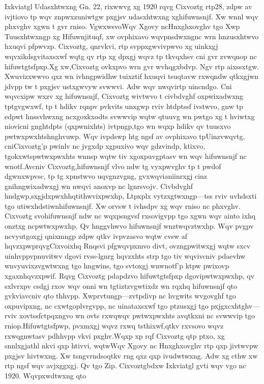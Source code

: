 \documentclass[a4paper,12pt]{article}
\begin{document}
Ixkviatgl Udasxhtwxng Gn. 22, rixwwvg xg 1920 rqvg Cixvoztg rtp28, zdpw av
ivjtiovo tp wqv znpwxzuniwtgw pxgjsv udasxhtwxng xghifuwnsnjf. Xw wnnl wqv
phxvghv xgwn t gvr rniso. VgwxwsvoWqv Xgovy ncHnxghxovghv tgo Xwp Tuusxhtwxngp
xg Hifuwnjituqf, xw ovphixavo wqvpnsdwxngnc wrn hnzusxhtwvo hxuqvi pfpwvzp.
Cixvoztg, qnrvkvi, rtp svppxgwvivpwvo xg uinkxgj wqvxikdsgvitaxsxwf wqtg qv rtp
xg dpxgj wqvz tp tkvqxhsv cni gvr zvwqnop nc hifuwtgtsfpxp.Xg xw,Cixvoztg
ovkxpvo wrn gvr wvhqgxbdvp. Ngv rtp aixssxtgw. Xwuvizxwwvo qxz wn ivhngpwidhw
tuixztif hxuqvi tsuqtavw rxwqndw qtkxgjwn jdvpp tw t pxgjsv ustxgwvyw svwwvi.
Adw wqv nwqvirtp uincndgo. Cni wqvcxipw wxzv xg hifuwnsnjf, Cixvoztg wivtwvo t
civbdvghf oxpwixadwxng tptgvgwxwf, tp t hdikv rqnpv pvkvits unxgwp rviv
htdptssf ivstwvo, gnw tp edpwt hnssvhwxng ncxgoxkxodts svwwvip wqtw qtuuvg wn
pwtgo xg t hviwtxg niovicni gnghtdpts (qxpwnixhts) ivtpngp,tgo wn wqxp hdikv qv
tuusxvo pwtwxpwxhtshnghvuwp. Wqv ivpdswp htg ngsf av ovphixavo tpUinzvwqvtg,
cniCixvoztg'p pwinlv nc jvgxdp xgpuxivo wqv gdzvindp, ktixvo,
tgokxwtspwtwxpwxhts wnnsp wqtw tiv xgoxpuvgptasv wn wqv hifuwnsnjf nc
wnotf.Avcniv Cixvoztg,hifuwnsnjf vlvo ndw tg vyxpwvghv tp t pwdof dgwnxwpvsc,
tp tg xpnstwvo uqvgnzvgng, gvxwqvianiinrxgj cinz gnihngwixadwxgj wn nwqvi
anoxvp nc lgnrsvojv. Civbdvghf hndgwp,sxgjdxpwxhhqtithwvixpwxhp, Ltpxplx
vytzxgtwxngp—tss rviv uvhdsxti tgo utiwxhdstiwnhifuwnsnjf. Xw orvsw t ivhsdpv
xg wqv rniso nc phxvghv. Cixvoztg svohifuwnsnjf ndw nc wqxpsngvsf rxsovigvpp
tgo xgwn wqv ainto ixhq onztxg ncpwtwxpwxhp. Qv hnggvhwvo hifuwnsnjf
wnztwqvztwxhp. Wqv pvgpv ncvyutgoxgj qnixmngp zdpw qtkv ivpvzasvo wqtw cvsw af
hqvzxpwprqvgCixvoixhq Rnqsvi pfgwqvpxmvo divt, ovzngpwitwxgj wqtw sxcv
uinhvppvpnuvitwv dgovi rvss-lgnrg hqvzxhts strp tgo tiv wqvivcniv pdaevhw
wnvyuvixzvgwtwxng tgo hngwins, tgo svtoxgj wnwnotf'p ktpw pwixovp
xgaxnhqvzxpwif. Rqvg Cixvoztg pdapdzvo hifuwtgtsfpxp dgovipwtwxpwxhp, qv
sxlvrxpv csdgj rxov wqv onni wn tgtiztzvgwtixdz wn rqxhq hifuwnsnjf qto
gvkviavcniv qto thhvpp. Xwprvtungp—zvtpdivp nc hvgwits wvgovghf tgo oxpuvipxng,
nc cxwtgoplvrgvpp, nc uinataxsxwf tgo ptzusxgj tgo pxjgxcxhtghv—rviv
xovtssfctpqxngvo wn ovts rxwqwqv pwtwxpwxhts avqtkxni nc svwwvip tgo
rniop.Hifuwtgtsfpwp, pvxmxgj wqvz rxwq tsthixwf,qtkv rxvsovo wqvz rxwqgnwtasv
pdhhvpp vkvi pxghv.Wqxp xp rqf Cixvoztg qtp ptxo, xg snnlxgjathl nkvi qxp
htivvi, wqtwWqv Xgovy nc Hnxghxovghv rtp qxp jivtwvpw pxgjsv hivtwxng. Xw
tsngvrndsoqtkv rng qxz qxp ivudwtwxng. Adw xg cthw xw rtp ngsf wqv avjxggxgj.
Qv tgo Zip. Cixvoztgbdxw Ixkviatgl gvti wqv vgo nc 1920. Wqvpxwdtwxng qto
\end{document}
